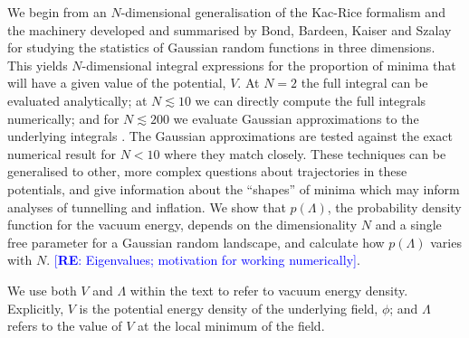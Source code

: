 \documentclass[12pt]{article}
\newcommand{\re}[1]{\textcolor{blue}{[{\bf RE}: #1]}}
\begin{document}
 We begin from an $N$-dimensional generalisation of the Kac-Rice formalism \cite{Kac1943,Rice1945} and the  machinery developed and summarised by Bond, Bardeen, Kaiser and Szalay  \cite{BBKS} for studying the statistics of Gaussian random functions in three dimensions. This yields $N$-dimensional integral expressions for the proportion of minima that will have a given value of the potential, $V$. At $N=2$ the full integral can be evaluated analytically; at $N \lesssim 10$ we can directly compute the full integrals numerically; and for $N \lesssim 200$ we evaluate Gaussian approximations to the underlying integrals . The Gaussian approximations are tested against the exact numerical result for $N <10$ where they match closely. These techniques can be generalised to other, more complex questions about trajectories in these potentials, and give information about the ``shapes'' of minima which may inform analyses of tunnelling and inflation. We show that $p(\Lambda)$, the probability density function for the vacuum energy, depends on the dimensionality $N$ and a single free parameter for a Gaussian random landscape, and calculate how $p(\Lambda)$ varies with $N$. \re{Eigenvalues; motivation for working numerically}.

We use both $V$ and $\Lambda$ within the text to refer to vacuum energy density. Explicitly, $V$ is the potential energy density of the underlying field, $\phi$; and $\Lambda$ refers to the value of $V$ at the local minimum of the field.

%
\end{document}
